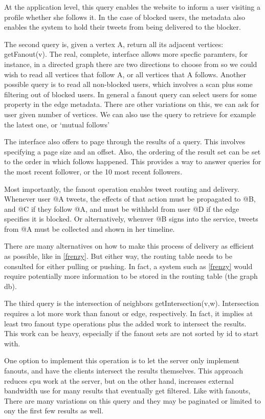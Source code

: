 At the application level, this query enables the website to inform a user visiting a profile whether she follows it. In the case of blocked users, the metadata also enables the system to hold their tweets from being delivered to the blocker.

The second query is, given a vertex A, return all its adjacent vertices: {\code getFanout(v)}. The real, complete, interface allows more specfic paramters, for instance, in a directed graph there are two directions to choose from so we could  wish to read  all vertices that follow A, or all vertices that A follows.  Another possible query is to read all non-blocked users, which involves a scan plus  some filtering out of blocked users. In general a fanout query can select users   for some property in the edge metadata.  There are other variations on this, we can ask for user given number of vertices. We can also use the query to retrieve  for example the latest one, or `mutual follows'

The interface also offers to page through the results of a query. This involves specifying a page size and an offset. Also, the ordering of the result set can be set to the order in which follows happened. This provides a way to answer queries for the most recent follower, or the 10 most recent followers.

Most importantly, the fanout operation enables tweet routing and delivery. Whenever user @A tweets, the effects of that action must be propagated to @B, and @C if they follow @A, and must be withheld from user @D if the edge specifies it is blocked. Or alternatively, whenver @B signs into the service, tweets from @A must be collected and shown in her timeline.  

There are many alternatives on how to make this process of delivery as efficient as possible, like in \ref{frenzy}. But either way, the routing table needs to be consulted for either pulling or pushing.  In fact,  a system such as \ref{frenzy} would require potentially more information to be stored in the routing table (the graph db).

The third query is the intersection of neighbors {\code getIntersection(v,w)}. Intersection requires a lot more work than fanout or edge, respectively. In fact, it implies at least two fanout type operations plus the added work to intersect the results. This work can be heavy, especially if the fanout sets are not sorted by id to start with.

  One option to implement this operation is to let  the server only implement fanouts, and have the clients intersect the results themselves. This approach reduces cpu work at the server,  but on the other hand, increases external bandwidth use for many results that eventually get filtered.   Like with fanouts, There are many variations on this query and they may be paginated or limited to ony the first few results as well.

